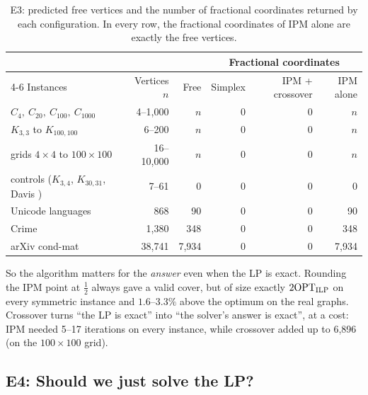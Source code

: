 \begin{table}[H]
  \centering\small
  \caption{E3: predicted free vertices and the number of fractional coordinates returned by each configuration. In every row, the fractional coordinates of IPM alone are exactly the free vertices.}
  \label{tab:e3}
  \begin{tabular}{@{}lrrrrr@{}}
    \toprule
    & & & \multicolumn{3}{c}{Fractional coordinates} \\
    \cmidrule(l){4-6}
    Instances & Vertices $n$ & Free & Simplex & IPM + crossover & IPM alone \\
    \midrule
    $C_4,\ C_{20},\ C_{100},\ C_{1000}$ & 4--1,000 & $n$ & 0 & 0 & $n$ \\
    $K_{3,3}$ to $K_{100,100}$ & 6--200 & $n$ & 0 & 0 & $n$ \\
    grids $4\times4$ to $100\times100$ & 16--10,000 & $n$ & 0 & 0 & $n$ \\
    controls ($K_{3,4}$, $K_{30,31}$, Davis \cite{davis1941}) & 7--61 & 0 & 0 & 0 & 0 \\
    Unicode languages & 868 & 90 & 0 & 0 & 90 \\
    Crime & 1,380 & 348 & 0 & 0 & 348 \\
    arXiv cond-mat \cite{newman2001} & 38,741 & 7,934 & 0 & 0 & 7,934 \\
    \bottomrule
  \end{tabular}
\end{table}

So the algorithm matters for the \emph{answer} even when the LP is exact. Rounding the IPM point at $\tfrac12$ always gave a valid cover, but of size exactly $2\mathrm{OPT}_{\mathrm{ILP}}$ on every symmetric instance and $1.6$--$3.3\%$ above the optimum on the real graphs. Crossover turns ``the LP is exact'' into ``the solver's answer is exact'', at a cost: IPM needed 5--17 iterations on every instance, while crossover added up to 6,896 (on the $100\times100$ grid).

\subsection{E4: Should we just solve the LP?}\label{sec:e4}

